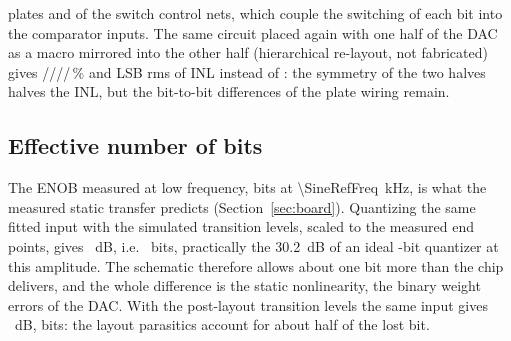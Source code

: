 plates and of the switch control nets, which couple the switching of each bit into the comparator
inputs.
\fi
The same circuit placed again with one half of the DAC as a macro mirrored into the other half
(hierarchical re-layout, not fabricated) gives \HierBitEA/\HierBitEB/\HierBitEC/\HierBitED/\HierBitEE\,\%
and \HierInlRms{} LSB rms of INL instead of \PexInlRms{}: the symmetry of the two halves halves the
INL, but the bit-to-bit differences of the plate wiring remain.
\fi

\subsection{Effective number of bits}
The ENOB measured at low frequency, \SineRefEnob{} bits at \SI{\SineRefFreq}{kHz}, is what the measured
static transfer predicts (Section~\ref{sec:board}). Quantizing the same fitted input with the simulated
transition levels, scaled to the measured end points, gives \SimStSinad{}~dB, i.e.\ \SimStEnob{} bits,
practically the \SI{30.2}{dB} of an ideal \AdcBits-bit quantizer at this amplitude. The schematic
therefore allows about one bit more than the chip delivers, and the whole difference is the static
nonlinearity, the binary weight errors of the DAC.\ifdefined\PexBitEA{} With the post-layout transition
levels the same input gives \PexStSinad~dB, \PexStEnob{} bits: the layout parasitics account for about
half of the lost bit.\fi

